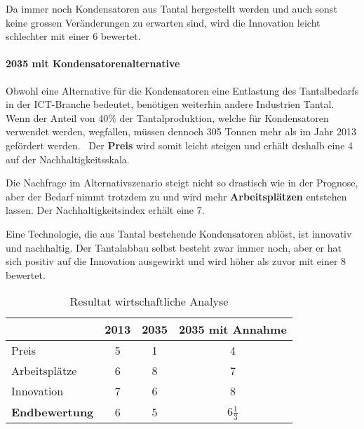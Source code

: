 Da immer noch Kondensatoren aus Tantal hergestellt werden und auch sonst keine grossen Veränderungen zu erwarten sind, wird die Innovation leicht schlechter mit einer 6 bewertet.

\paragraph{2035 mit Kondensatorenalternative}
Obwohl eine Alternative für die Kondensatoren eine Entlastung des Tantalbedarfs in der ICT-Branche bedeutet, benötigen weiterhin andere Industrien Tantal. Wenn der Anteil von 40\% der Tantalproduktion, welche für Kondensatoren verwendet werden, wegfallen, müssen dennoch 305 Tonnen mehr als im Jahr 2013 gefördert werden.~\cite{tantal_price2} Der \textbf{Preis} wird somit leicht steigen und erhält deshalb eine 4 auf der Nachhaltigkeitsskala.

Die Nachfrage im Alternativszenario steigt nicht so drastisch wie in der Prognose, aber der Bedarf nimmt trotzdem zu und wird mehr \textbf{Arbeitsplätzen} entstehen lassen. Der Nachhaltigkeitsindex erhält eine 7.

Eine Technologie, die aus Tantal bestehende Kondensatoren ablöst, ist innovativ und nachhaltig. Der Tantalabbau selbst besteht zwar immer noch, aber er hat sich positiv auf die Innovation ausgewirkt und wird höher als zuvor mit einer 8 bewertet.

\begin{table}[h]
  \centering
  \begin{tabular}{l|ccc}            & \textbf{2013} & \textbf{2035} & \textbf{2035 mit Annahme}
    \\ \hline Preis                 & 5             & 1             & 4
    \\ Arbeitsplätze                & 6             & 8             & 7
    \\ Innovation                   & 7             & 6             & 8
    \\ \hline \textbf{Endbewertung} & 6             & 5             & 6\(\frac{1}{3}\)
  \end{tabular}
  \caption{Resultat wirtschaftliche Analyse}
\end{table}
